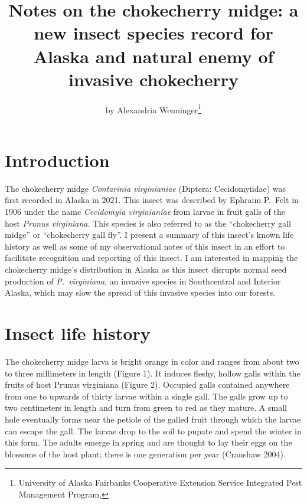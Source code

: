 \title{Notes on the chokecherry midge: a new insect species record for Alaska and natural enemy of invasive chokecherry}

\author{by Alexandria Wenninger\footnote{University of Alaska Fairbanks Cooperative Extension Service Integrated Pest Management Program, }}

\maketitle

\section{Introduction}

The chokecherry midge \textit{Contarinia virginianiae} (Diptera: Cecidomyiidae) was first recorded in Alaska in 2021. This insect was described by Ephraim P.\ Felt in 1906 under the name \textit{Cecidomyia virginianiae} from larvae in fruit galls of the host \textit{Prunus virginiana}. This species is also referred to as the ``chokecherry gall midge'' or ``chokecherry gall fly''. I present a summary of this insect's known life history as well as some of my observational notes of this insect in an effort to facilitate recognition and reporting of this insect. I am interested in mapping the chokecherry midge's distribution in Alaska as this insect disrupts normal seed production of \textit{P.\ virginiana}, an invasive species in Southcentral and Interior Alaska, which may slow the spread of this invasive species into our forests. 

\section{Insect life history}

The chokecherry midge larva is bright orange in color and ranges from about two to three millimeters in length (Figure 1). It induces fleshy, hollow galls within the fruits of host Prunus virginiana (Figure 2). Occupied galls contained anywhere from one to upwards of thirty larvae within a single gall. The galls grow up to two centimeters in length and turn from green to red as they mature. A small hole eventually forms near the petiole of the galled fruit through which the larvae can escape the gall. The larvae drop to the soil to pupate and spend the winter in this form. The adults emerge in spring and are thought to lay their eggs on the blossoms of the host plant; there is one generation per year (Cranshaw 2004). 

